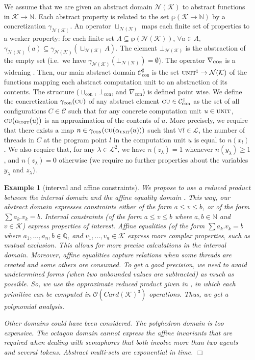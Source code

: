 \documentclass{article}
\newcommand{\boxexample}{$\Box$}
\newtheorem{example}[thm]{Example}
\newcommand{\Labels}{\mathcal{L}}
\newcommand{\prolabel}{\Labels}
\newcommand{\states}{\mathcal{C}}
\newcommand{\piunit}{\alpha_\computationunit}
\newcommand{\computationunit}{\textsc{unit}}
\newcommand{\abstractunit}{\textsc{unit}^{\sharp}}
\newcommand{\aunion}[1]{\sqcup_{#1}}
\newcommand{\adom}[1]{\mathcal{C}_{#1}^{\sharp}}
\newcommand{\abot}[1]{\bot_{#1}}
\newcommand{\wid}[1]{\nabla_{#1}}
\newcommand{\tp}{\textsc{cu}}
\newcommand{\var}{\mathcal{K}}
\newcommand{\numkey}{\textsc{con}}
\newcommand{\abstnum}{\mathcal{N}(\var)}
\newcommand{\gammanum}{\gamma_{\abstnum}}
\newcommand{\cupnum}{\sqcup_{\abstnum}}
\newcommand{\botnum}{\bot_{\abstnum}}
\newcommand{\concnum}{\gamma_{\numkey}}
\newcommand{\widnum}{\wid{\numkey}}
\newcommand{\Numkey}{\text{con}}
\newcommand{\Numdom}{\adom{\Numkey}}
\newcommand{\botNum}{\abot{\Numkey}}
\newcommand{\cupNum}{\aunion{\Numkey}}
\newcommand{\gammaNum}{\gamma_{\Numkey}}
\newcommand{\countdom}{interval and affine constraints}
\newcommand{\icount}{\countdom}
\begin{document}
We assume that we are given an abstract domain $\abstnum$ to abstract functions in $\var\rightarrow \mathbb{N}$.
Each abstract property is related to the set $\wp(\var\rightarrow \mathbb{N})$ by a  concretization $\gammanum$.
An operator $\cupnum$ maps each finite set of properties to a weaker
property: for each finite set $A \subseteq \wp(\abstnum)$,
$\forall a\in A$, $\gammanum(a)\subseteq \gammanum(\cupnum A)$. 
The element $\botnum$ is the abstraction of the empty set (i.e.~we have $\gammanum(\botnum)=\emptyset$).  The operator $\widnum$ is a widening \cite{cc:galois-widening}.
Then, our main  abstract domain 
$\Numdom$ is the set $\abstractunit \rightarrow \abstnum$ of the functions mapping each abstract computation unit to an abstraction of its contents.
The structure ($\cupNum$, $\botNum$, and $\wid{\Numkey}$)  is defined point wise. 
We define the concretization $\gammaNum(\tp)$ of any abstract element $\tp\in\Numdom$ as the set of  all configurations $C\in\states$ such that for any concrete computation unit $u\in\computationunit$, $\tp(\piunit(u))$ is an approximation of the contents of $u$. More precisely, we require that there exists  a map  $n\in\concnum(\tp(\piunit(u)))$ such that $\forall l\in\prolabel$, the number of  threads in $C$ at the program point  $l$ in the computation unit $u$ is equal to $n(x_l)$. We also require that, for any $\lambda\in\prolabel^2$, we have $n(z_{\lambda})=1$ whenever $n(y_{\lambda})\geq 1$, and  $n(z_{\lambda})=0$ otherwise (we require no further properties about the variables $y_\lambda$ and $z_{\lambda}$).

\begin{example}[\icount]
\label{intequ}
We propose to use a reduced product between the interval domain \cite{cc76} and the affine equality domain \cite{karr}. This way, our abstract domain expresses constraints either of the form $a\leq v\leq b$, or of the form $\sum  a_k.v_k = b$. Interval constraints (of the form $a\leq v\leq b$ where $a,b\in\mathbb{N}$ and $v\in\var$) express properties of interest. Affine equalities (of the form $\sum a_k.v_k = b$ where $a_1,\ldots,a_n,b\in\mathbb{Q}$, and $v_1,\ldots,v_n \in \var$ express more complex properties, such as mutual exclusion. This allows for more precise calculations in the interval domain. Moreover, affine equalities capture relations when some threads are created and some others are consumed. To get a good precision, we need  to avoid undetermined forms (when two unbounded values are subtracted) as much as possible.  So, we use the approximate reduced product given in \cite[Chap.~9]{feret:thesis}, in which each primitive can be computed in $\mathcal{O}(\textit{Card}(\var)^3)$ operations. Thus, we get a polynomial analysis. 

Other domains could have been considered. 
The polyhedron domain  \cite{ch} is too  expensive.
The octagon domain   \cite{mine:thesis,mine} cannot express the affine invariants that are required when dealing with semaphores that both involve more than two agents and several tokens.
Abstract multi-sets \cite{HJNN99ai,NiNi00popl} are exponential  in time.
\boxexample\end{example}
\end{document}
